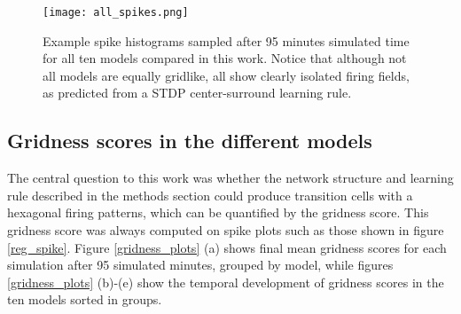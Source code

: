 \documentclass{article}
\begin{document}
    \begin{figure}[H]
        \centering
        \texttt{[image: all\_spikes.png]}
        \caption{Example spike histograms sampled after 95 minutes simulated time for all ten models compared in this work. Notice that although not all models are equally gridlike, all show clearly isolated firing fields, as predicted from a STDP center-surround learning rule.}
        \label{all_spikes}
    \end{figure}

    \subsection{Gridness scores in the different models} \label{Gscore}
    
    The central question to this work was whether the network structure and learning rule described in the methods section could produce transition cells with a hexagonal firing patterns, which can be quantified by the gridness score. This gridness score was always computed on spike plots such as those shown in figure \ref{reg_spike}. Figure \ref{gridness_plots} (a) shows final mean gridness scores for each simulation after 95 simulated minutes, grouped by model, while figures \ref{gridness_plots} (b)-(e) show the temporal development of gridness scores in the ten models sorted in groups.
    
\end{document}
